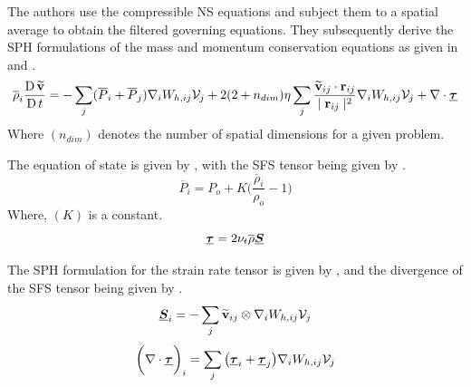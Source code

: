 The authors use the compressible NS equations and subject them to a spatial average to obtain the filtered governing equations. They subsequently derive the SPH formulations of the mass and momentum conservation equations as given in  and .
\begin{equation}
    \overline{\rho}_i\frac{\operatorname{D} \widetilde{\mathbf{v}}}{\operatorname{D} t} = - \sum_j (\overline{P}_i + \overline{P}_j) \nabla_{i} W_{h, ij} \mathcal{V}_j + 2(2+n_{dim})\eta \sum_j \frac{\widetilde{\mathbf{v}}_{ij} \cdot \mathbf{r}_{ij}}{\mid \mathbf{r}_{ij} \mid^{2}}\nabla_{i} W_{h, ij} \mathcal{V}_j + \nabla \cdot \underline{\bm{\tau}}
    \label{eq:Okraschevski2022-mom-sph}
\end{equation}
Where $(n_{dim})$ denotes the number of spatial dimensions for a given problem.

The equation of state is given by , with the SFS tensor being given by .
\begin{equation}
    \overline{P}_i = P_o + K\bigg(\frac{\overline{\rho}_i}{\rho_o} - 1 \bigg)
    \label{eq:Okraschevski2022-eos-sph}
\end{equation}
Where, $(K)$ is a constant.
\begin{equation}
    \underline{\bm{\tau}} = 2\nu_t\overline{\rho}\underline{\bm{S}}
    \label{eq:Okraschevski2022-tau}
\end{equation}

The SPH formulation for the strain rate tensor is given by , and the divergence of the SFS tensor being given by .
\begin{equation}
    \underline{\bm{S}}_i = - \sum_j \widetilde{\mathbf{v}}_{ij} \otimes \nabla_{i} W_{h, ij} \mathcal{V}_j
    \label{eq:Okraschevski2022-S-tensor-sph}
\end{equation}
\begin{equation}
    \bigg(\nabla \cdot \underline{\bm{\tau}}\bigg)_i =\sum_j \big( \underline{\bm{\tau}}_i + \underline{\bm{\tau}}_j \big) \nabla_{i} W_{h, ij} \mathcal{V}_j
    \label{eq:Okraschevski2022-div-tau-sph}
\end{equation}


